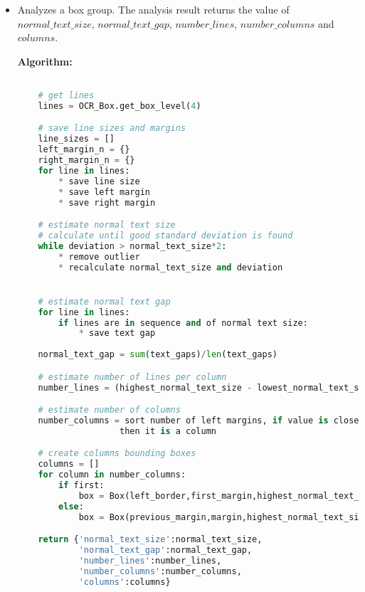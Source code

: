 \documentclass{article}
\newcommand{\resizeHeight}[2][1em]{\resizebox{!}{#1}{#2}}
\begin{document}
\begin{itemize}
    \renewcommand\labelitemi{}  %

    \item \resizeHeight{$\mathbf{analyze\_text}$ : $ OCR\_Box \rightarrow Dict $}
    
    Analyzes a box group. The analysis result returns the value of $normal\_text\_size$, $normal\_text\_gap$, $number\_lines$, $number\_columns$ and $columns$.

    \textbf{Algorithm:}

    \begin{lstlisting}[language=Python, caption=analyze\_text algorithm]

    # get lines
    lines = OCR_Box.get_box_level(4)

    # save line sizes and margins
    line_sizes = []
    left_margin_n = {}
    right_margin_n = {}
    for line in lines:
        * save line size
        * save left margin
        * save right margin

    # estimate normal text size
    # calculate until good standard deviation is found
    while deviation > normal_text_size*2:
        * remove outlier
        * recalculate normal_text_size and deviation


    # estimate normal text gap
    for line in lines:
        if lines are in sequence and of normal text size:
            * save text gap
    
    normal_text_gap = sum(text_gaps)/len(text_gaps)

    # estimate number of lines per column
    number_lines = (highest_normal_text_size - lowest_normal_text_size) / normal_text_gap

    # estimate number of columns
    number_columns = sort number of left margins, if value is close to number_lines, 
                    then it is a column

    # create columns bounding boxes
    columns = []
    for column in number_columns:
        if first:
            box = Box(left_border,first_margin,highest_normal_text_size,lowest_normal_text_size)
        else:
            box = Box(previous_margin,margin,highest_normal_text_size,lowest_normal_text_size)

    return {'normal_text_size':normal_text_size,
            'normal_text_gap':normal_text_gap,
            'number_lines':number_lines,
            'number_columns':number_columns,
            'columns':columns}
    \end{lstlisting}



\end{itemize}
\end{document}
